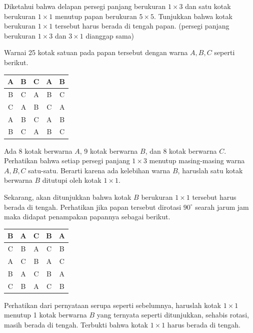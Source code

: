 \documentclass[11pt]{scrartcl}
\begin{document}
\begin{soaljawab}
    Diketahui bahwa delapan persegi panjang berukuran $1 \times 3$ dan satu kotak berukuran $1 \times 1$ menutup papan berukuran $5 \times 5$. Tunjukkan bahwa kotak berukuran $1 \times 1$ tersebut harus berada di tengah papan. (persegi panjang berukuran $1 \times 3$ dan $3 \times 1$ dianggap sama)
    \begin{solusi}
    Warnai 25 kotak satuan pada papan tersebut dengan warna $A,B,C$ seperti berikut.
        \begin{center}
        \begin{tabular}{ |c|c|c|c|c| }
			\hline
			A & B & C & A & B \\
			\hline
			B & C & A & B & C \\
			\hline
			C & A & B & C & A \\
			\hline
			A & B & C & A & B \\
			\hline
			B & C & A & B & C \\
			\hline
		\end{tabular}
        \end{center}
        Ada 8 kotak berwarna $A$, 9 kotak berwarna $B$, dan $8$ kotak berwarna $C$. Perhatikan bahwa setiap persegi panjang $1 \times 3$ menutup masing-masing warna $A,B,C$ satu-satu. Berarti karena ada kelebihan warna $B$, haruslah satu kotak berwarna $B$ ditutupi oleh kotak $1 \times 1$.
        
        Sekarang, akan ditunjukkan bahwa kotak $B$ berukuran $1 \times 1$ tersebut harus berada di tengah. Perhatikan jika papan tersebut dirotasi $90^\circ$ searah jarum jam maka didapat penampakan papannya sebagai berikut.
        \begin{center}
        \begin{tabular}{ |c|c|c|c|c| }
		\hline
		B & A & C & B & A \\
		\hline
		C & B & A & C & B \\
		\hline
		A & C & B & A & C \\
		\hline
		B & A & C & B & A \\
		\hline
		C & B & A & C & B \\
		\hline
	\end{tabular}
        \end{center}
        Perhatikan dari pernyataan serupa seperti sebelumnya, haruslah kotak $1 \times 1$ menutup 1 kotak berwarna $B$ yang ternyata seperti ditunjukkan, sehabis rotasi, masih berada di tengah. Terbukti bahwa kotak $1 \times 1$ harus berada di tengah.
    \end{solusi}
\end{soaljawab}
\end{document}
